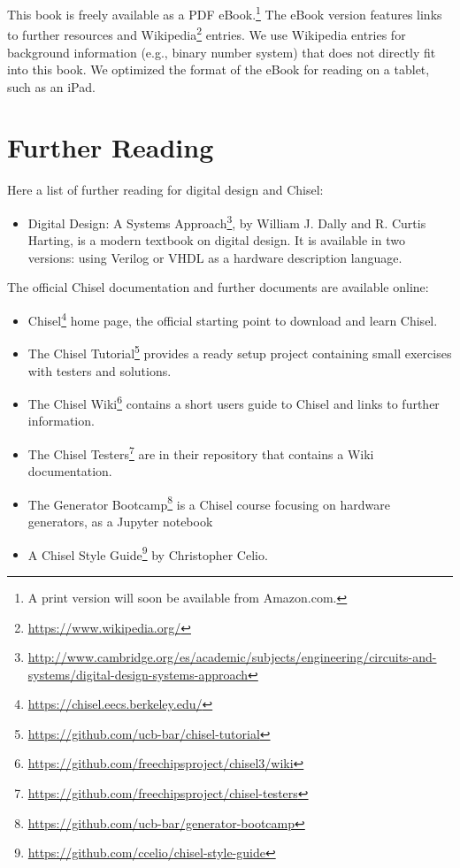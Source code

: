\documentclass[%
    10pt,
    headinclude, footexclude,
    openright, %
    notitlepage,
    cleardoubleempty,
    headsepline,
    pointlessnumbers,
    bibtotoc, idxtotoc,
    ]{scrbook}
\newcommand{\myref}[2]{\href{#1}{#2}}
\renewcommand{\myref}[2]{{#2}{\footnote{\url{#1}}}}
\begin{document}
This book is freely available as a PDF eBook.\footnote{A print version will soon be available
from Amazon.com.} The eBook version features links to further resources
and \myref{https://www.wikipedia.org/}{Wikipedia} entries.
We use Wikipedia entries for background information (e.g., binary number system)
that does not directly fit into this book.
We optimized the format of the eBook for reading on a tablet, such as an iPad.

\section{Further Reading}

Here a list of further reading for digital design and Chisel:
\begin{itemize}
\item \myref{http://www.cambridge.org/es/academic/subjects/engineering/circuits-and-systems/digital-design-systems-approach}{Digital Design: A Systems Approach}, by William J. Dally and R. Curtis Harting,
is a modern textbook on digital design. It is available in two versions: using Verilog or VHDL as a hardware description language.
\end{itemize}

The official Chisel documentation and further documents are available online:

\begin{itemize}
\item \myref{https://chisel.eecs.berkeley.edu/}{Chisel} home page, the official starting point to
download and learn Chisel.
\item The \myref{https://github.com/ucb-bar/chisel-tutorial}{Chisel Tutorial} provides a ready setup
project containing small exercises with testers and solutions.

\item The \myref{https://github.com/freechipsproject/chisel3/wiki}{Chisel Wiki} contains
a short users guide to Chisel and links to further information.
\item The \myref{https://github.com/freechipsproject/chisel-testers}{Chisel Testers} are in
their repository that contains a Wiki documentation.
\item The \myref{https://github.com/ucb-bar/generator-bootcamp}{Generator Bootcamp} is
a Chisel course focusing on hardware generators, as a Jupyter notebook
\item A \myref{https://github.com/ccelio/chisel-style-guide}{Chisel Style Guide} by Christopher Celio.
\end{itemize}
\end{document}
